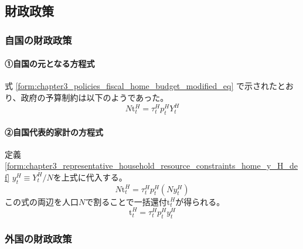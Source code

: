 
\subsection{財政政策}
\label{sec:chapter3_representative_household_fiscal_policy}

\subsubsection{自国の財政政策}
\label{sec:chapter3_representative_household_fiscal_policy_home}

\paragraph{①自国の元となる方程式}
\label{sec:chapter3_representative_household_fiscal_policy_home_original}
式
\eqref{form:chapter3_policies_fiscal_home_budget_modified_eq}
で示されたとおり、政府の予算制約は以下のようであった。
\begin{equation}
\label{form:chapter3_representative_household_fiscal_policy_home_original_budget_eq}
    N\mathrm{t}_t^H=\tau_t^Hp_t^HY_t^H
\end{equation}

\paragraph{②自国代表的家計の方程式}
\label{sec:chapter3_representative_household_fiscal_policy_home_representative}
定義
\eqref{form:chapter3_representative_household_resource_constraints_home_y_H_def}
\(y_t^H\equiv Y_t^H/N\)を上式に代入する。
\begin{equation}
\label{form:chapter3_representative_household_fiscal_policy_home_representative_budget_eq}
    N\mathrm{t}_t^H=\tau_t^Hp_t^H(Ny_t^H)
\end{equation}
この式の両辺を人口\(N\)で割ることで一括還付\(\mathrm{t}_t^H\)が得られる。
\begin{equation}
\label{form:chapter3_representative_household_fiscal_policy_home_representative_budget2_eq}
    \mathrm{t}_t^H=\tau_t^Hp_t^Hy_t^H
\end{equation}

\subsubsection{外国の財政政策}
\label{sec:chapter3_representative_household_fiscal_policy_foreign}

